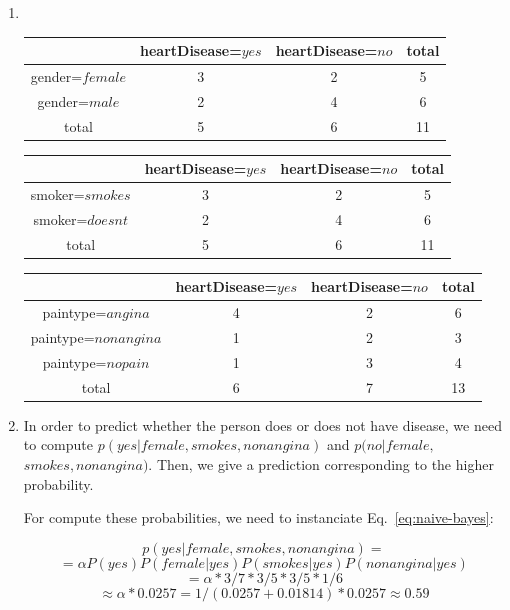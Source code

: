 \begin{enumerate}

\item \


\begin{tabular}{|c|c|c|c|}\hline
& heartDisease=$yes$ & heartDisease=$no$ & total \\ \hline
gender=$female$ & 3 & 2 & 5 \\ \hline
gender=$male$ & 2 & 4 & 6 \\ \hline
total & 5 & 6 & 11 \\ \hline
\end{tabular}

\vspace{0.5cm}

\begin{tabular}{|c|c|c|c|}\hline
& heartDisease=$yes$ & heartDisease=$no$ & total \\ \hline
smoker=$smokes$ & 3 & 2 & 5 \\ \hline
smoker=$doesnt$ & 2 & 4 & 6 \\ \hline
total & 5 & 6 & 11 \\ \hline
\end{tabular}

\vspace{0.5cm}

\begin{tabular}{|c|c|c|c|}\hline
& heartDisease=$yes$ & heartDisease=$no$ & total \\ \hline
paintype=$angina$& 4 & 2 & 6 \\ \hline
paintype=$nonangina$& 1 & 2 & 3 \\ \hline
paintype=$nopain$ & 1 & 3 & 4 \\ \hline
total & 6 & 7 & 13 \\ \hline
\end{tabular}

\vspace{0.5cm}

\item  In order to predict whether the person does or does not have disease, we need to compute $p(yes|female,smokes,nonangina)$ and $p(no|female,$ $smokes,nonangina)$. Then, we give a prediction corresponding to the higher probability.

For compute these probabilities, we need to instanciate Eq.~\ref{eq:naive-bayes}:

\[p(yes|female,smokes,nonangina) =\]
\[= \alpha P(yes) P(female|yes) P(smokes|yes) P(nonangina|yes)\]
\[= \alpha * 3/7 * 3/5 * 3/5 * 1/6\]
\[\approx \alpha * 0.0257 = 1 / (0.0257 + 0.01814) * 0.0257 \approx 0.59\]


\end{enumerate}
